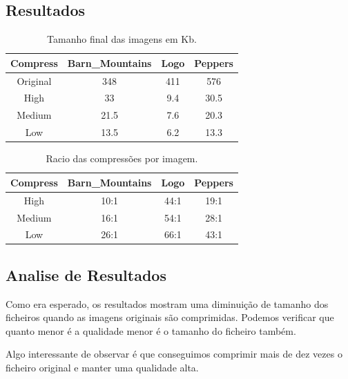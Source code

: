 \documentclass[a4paper, 12pt]{article}
\begin{document}
    \subsection{Resultados}
        \begin{table}[h!]
            \centering
            \addtolength\tabcolsep{20pt}
            \begin{tabular}{||c | c c c||} 
                \hline
                Compress & Barn\_Mountains & Logo & Peppers \\ 
                \hline\hline
                Original & 348 & 411 & 576  \\ 
                High & 33 & 9.4 & 30.5  \\
                Medium & 21.5 & 7.6 & 20.3  \\
                Low & 13.5 & 6.2 & 13.3  \\
                \hline
            \end{tabular}
            \caption{\label{demo-table} Tamanho final das imagens em Kb.}
        \end{table}
        \begin{table}[h!]
            \centering
            \addtolength\tabcolsep{20pt}
            \begin{tabular}{||c | c c c||} 
                \hline
                Compress & Barn\_Mountains & Logo & Peppers \\ 
                \hline\hline
                High   & 10:1 & 44:1 & 19:1  \\
                Medium & 16:1 & 54:1 & 28:1  \\
                Low    & 26:1 & 66:1 & 43:1  \\
                \hline
            \end{tabular}
            \caption{\label{demo-table} Racio das compressões por imagem.}
        \end{table}
    \subsection{Analise de Resultados}
        Como era esperado, os resultados mostram uma diminuição de tamanho dos ficheiros quando as imagens 
        originais são comprimidas. Podemos verificar que quanto menor é a qualidade menor é o tamanho do
        ficheiro também.   
        
        Algo interessante de observar é que conseguimos comprimir mais de dez vezes o ficheiro original e 
        manter uma qualidade alta.
\end{document}
